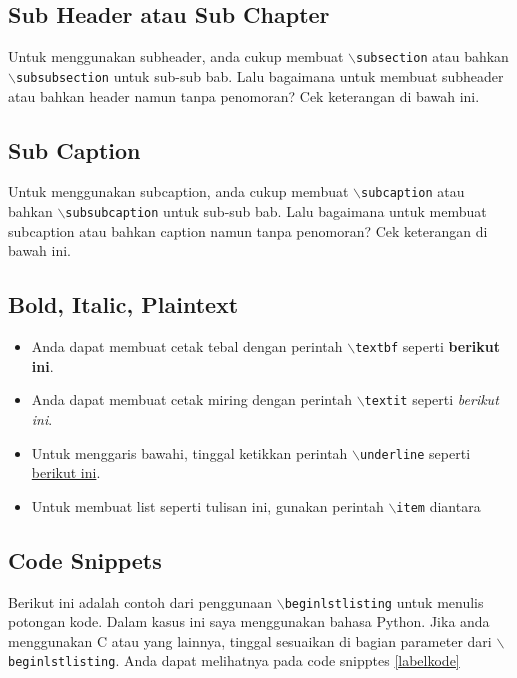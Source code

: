 \documentclass[11pt,a4paper]{article}
\begin{document}
\subsection*{Sub Header atau Sub Chapter}
    Untuk menggunakan subheader, anda cukup membuat $\backslash${\tt{subsection}} atau bahkan  $\backslash${\tt{subsubsection}} untuk sub-sub bab. Lalu bagaimana untuk membuat subheader atau bahkan header namun tanpa penomoran? Cek keterangan di bawah ini.
\subsection*{Sub Caption}
    Untuk menggunakan subcaption, anda cukup membuat $\backslash${\tt{subcaption}} atau bahkan  $\backslash${\tt{subsubcaption}} untuk sub-sub bab. Lalu bagaimana untuk membuat subcaption atau bahkan caption namun tanpa penomoran? Cek keterangan di bawah ini.
\subsection{Bold, Italic, Plaintext}
\begin{itemize}
    \item Anda dapat membuat cetak tebal dengan perintah $\backslash${\tt{textbf}} seperti \textbf{berikut ini}.
    \item Anda dapat membuat cetak miring dengan perintah $\backslash${\tt{textit}} seperti \textit{berikut ini}. \item Untuk menggaris bawahi, tinggal ketikkan perintah $\backslash${\tt{underline}} seperti \underline{berikut ini}.
    \item Untuk membuat list seperti tulisan ini, gunakan perintah $\backslash${\tt{item}} diantara
\end{itemize}

\subsection{Code Snippets}
    Berikut ini adalah contoh dari penggunaan $\backslash${\tt{begin{lstlisting}}} untuk menulis potongan kode. Dalam kasus ini saya menggunakan bahasa Python. Jika anda menggunakan C atau yang lainnya, tinggal sesuaikan di bagian parameter dari $\backslash${\tt{begin{lstlisting}}}. Anda dapat melihatnya pada code snipptes \ref{labelkode}
    
\end{document}
